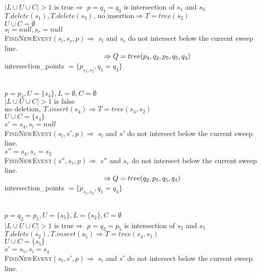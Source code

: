 \documentclass[english, fontsize=12pt, paper=a4, twoside=false, open=right, draft=true, pagesize=auto, version=last, DIV=16]{scrartcl}
\theoremstyle{break}
\begin{document}
$|L \cup U \cup C|>1 \text{ is true} \Rightarrow $ $p = q_1=q_3$ is intersection of $s_1$ and $s_3$ \\
$T.delete(s_1), T.delete(s_3) \text{, no insertion} \Rightarrow T=tree(s_2)$ \\
$U \cup C=\emptyset$ \\
$s_l=null, s_r=null$ \\ 
{\scshape{FindNewEvent}}$(s_l,s_r,p) \Rightarrow$ $s_l$ and $s_r$ do not intersect below the current sweep line. \\
$\hspace*{49.5mm} \Rightarrow Q=tree(p_4,q_2,p_5,q_5,q_4)$ \\
intersection\_points $= \{p_{s_1,s_2},q_1=q_3\}$ \par
\vspace*{-3mm}
\hrulefill \\
$p = p_4, U = \{s_4\}, L=\emptyset, C=\emptyset$ \\
$|L \cup U \cup C|>1 \text{ is false}$ \\
$\text{no deletion}, \ T.insert(s_4) \Rightarrow T=tree(s_4,s_2)$ \\
$U \cup C=\{s_4\}$ \\
$s'=s_4, s_l=null$ \\ 
{\scshape{FindNewEvent}}$(s_l,s',p) \Rightarrow$ $s_l$ and $s'$ do not intersect below the current sweep line. \\
$s''=s_4, s_r=s_2$ \\ 
{\scshape{FindNewEvent}}$(s'',s_r,p) \Rightarrow$ $s''$ and $s_r$ do not intersect below the current sweep line. \\
$\hspace*{49.5mm} \Rightarrow Q=tree(q_2,p_5,q_5,q_4)$ \\
intersection\_points $= \{p_{s_1,s_2},q_1=q_3\}$ \par
\vspace*{-3mm}
\hrulefill \\
$p = q_2=p_5, U = \{s_5\}, L=\{s_2\}, C=\emptyset$ \\
$|L \cup U \cup C|>1 \text{ is true} \Rightarrow $ $p = q_2=p_5$ is intersection of $s_2$ and $s_5$ \\
$T.delete(s_2), T.insert(s_5) \Rightarrow T=tree(s_4,s_5)$ \\
$U \cup C=\{s_5\}$ \\
$s'=s_5, s_l=s_4$ \\ 
{\scshape{FindNewEvent}}$(s_l,s',p) \Rightarrow$ $s_l$ and $s'$ do not intersect below the current sweep line. \\
\end{document}
